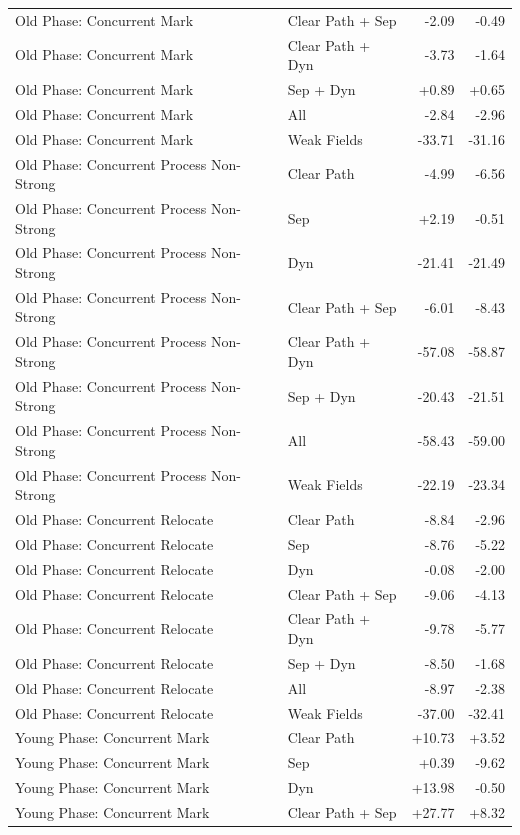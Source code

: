 \begin{table}[t]
\begin{tabular}{llrr}
Old Phase: Concurrent Mark & Clear Path + Sep & -2.09 & -0.49 \\
Old Phase: Concurrent Mark & Clear Path + Dyn & -3.73 & -1.64 \\
Old Phase: Concurrent Mark & Sep + Dyn & +0.89 & +0.65 \\
Old Phase: Concurrent Mark & All & -2.84 & -2.96 \\
Old Phase: Concurrent Mark & Weak Fields & -33.71 & -31.16 \\
Old Phase: Concurrent Process Non-Strong & Clear Path & -4.99 & -6.56 \\
Old Phase: Concurrent Process Non-Strong & Sep & +2.19 & -0.51 \\
Old Phase: Concurrent Process Non-Strong & Dyn & -21.41 & -21.49 \\
Old Phase: Concurrent Process Non-Strong & Clear Path + Sep & -6.01 & -8.43 \\
Old Phase: Concurrent Process Non-Strong & Clear Path + Dyn & -57.08 & -58.87 \\
Old Phase: Concurrent Process Non-Strong & Sep + Dyn & -20.43 & -21.51 \\
Old Phase: Concurrent Process Non-Strong & All & -58.43 & -59.00 \\
Old Phase: Concurrent Process Non-Strong & Weak Fields & -22.19 & -23.34 \\
Old Phase: Concurrent Relocate & Clear Path & -8.84 & -2.96 \\
Old Phase: Concurrent Relocate & Sep & -8.76 & -5.22 \\
Old Phase: Concurrent Relocate & Dyn & -0.08 & -2.00 \\
Old Phase: Concurrent Relocate & Clear Path + Sep & -9.06 & -4.13 \\
Old Phase: Concurrent Relocate & Clear Path + Dyn & -9.78 & -5.77 \\
Old Phase: Concurrent Relocate & Sep + Dyn & -8.50 & -1.68 \\
Old Phase: Concurrent Relocate & All & -8.97 & -2.38 \\
Old Phase: Concurrent Relocate & Weak Fields & -37.00 & -32.41 \\
Young Phase: Concurrent Mark & Clear Path & +10.73 & +3.52 \\
Young Phase: Concurrent Mark & Sep & +0.39 & -9.62 \\
Young Phase: Concurrent Mark & Dyn & +13.98 & -0.50 \\
Young Phase: Concurrent Mark & Clear Path + Sep & +27.77 & +8.32 \\

\end{tabular}
\end{table}
